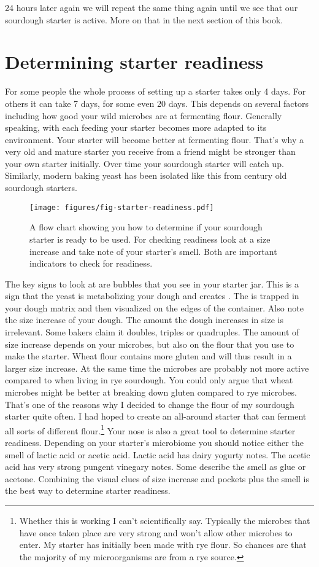 24 hours later again we will repeat the same thing again until
we see that our sourdough starter is active. More on that in the
next section of this book.

\section{Determining starter readiness}

For some people the whole process of setting up a starter takes
only 4 days. For others it can take 7 days, for some even 20 days.
This depends on several factors including how good your wild microbes
are at fermenting flour. Generally speaking, with each feeding
your starter becomes more adapted to its environment. Your
starter will become better at fermenting flour. That's why
a very old and mature starter you receive from a friend might
be stronger than your own starter initially. Over time
your sourdough starter will catch up. Similarly, modern baking
yeast has been isolated like this from century old sourdough
starters.

\begin{figure}[!htb]
  \texttt{[image: figures/fig-starter-readiness.pdf]}
  \caption{A flow chart showing you how to determine if your sourdough starter is ready to be used.
  For checking readiness look at a size increase and take note of your starter's smell. Both are important
  indicators to check for readiness.}
  \label{fig:sourdough-starter-readiness}
\end{figure}

The key signs to look at are bubbles that you see in your starter
jar. This is a sign that the yeast is metabolizing your
dough and creates . The  is trapped in your dough
matrix and then visualized on the edges of the container.
Also note the size increase of your dough. The amount the dough increases
in size is irrelevant. Some bakers claim it doubles, triples or quadruples.
The amount of size increase depends on your microbes, but also on
the flour that you use to make the starter. Wheat flour contains
more gluten and will thus result in a larger size increase. At
the same time the microbes are probably not more active compared
to when living in rye sourdough. You could only argue that
wheat microbes might be better at breaking down gluten compared
to rye microbes. That's one of the reasons why I decided to change
the flour of my sourdough starter quite often. I had hoped to create
an all-around starter that can ferment all sorts of different flour.\footnote
{Whether this is working I can't scientifically say.
Typically the microbes that have once taken place are very strong
and won't allow other microbes to enter. My starter has initially
been made with rye flour. So chances are that the majority of
my microorganisms are from a rye source.} Your nose is also
a great tool to determine starter readiness. Depending on
your starter's microbiome you should notice either the smell
of lactic acid or acetic acid. Lactic acid has dairy yogurty notes.
The acetic acid has very strong pungent vinegary notes. Some
describe the smell as glue or acetone. Combining the visual clues
of size increase and pockets plus the smell is the best way
to determine starter readiness.

